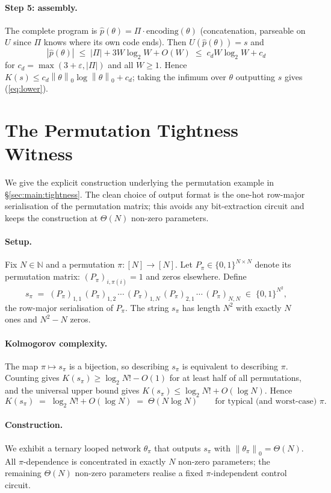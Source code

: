 \documentclass{article}
\theoremstyle{definition}
\newcommand{\N}{\mathbb{N}}
\newcommand{\B}{\{0,1\}}
\newcommand{\norm}[1]{\left\lVert#1\right\rVert}
\newcommand{\eps}{\varepsilon}
\begin{document}
\paragraph{Step 5: assembly.} The complete program is $\hat p(\theta) = \Pi \cdot \text{encoding}(\theta)$
(concatenation, parseable on $U$ since $\Pi$ knows where its own code ends).
Then $U(\hat p(\theta)) = s$ and
\[
  |\hat p(\theta)| \;\le\; |\Pi| + 3 W \log_2 W + O(W) \;\le\; c_d W \log_2 W + c_d
\]
for $c_d = \max(3 + \eps, |\Pi|)$ and all $W \ge 1$. Hence $K(s) \le c_d
  \norm{\theta}_0 \log \norm{\theta}_0 + c_d$; taking the infimum over $\theta$
outputting $s$ gives (\ref{eq:lower}).

\section{The Permutation Tightness Witness}\label{app:permutation}

We give the explicit construction underlying the permutation example in
\S\ref{sec:main:tightness}. The clean choice of output format is the one-hot
row-major serialisation of the permutation matrix; this avoids any
bit-extraction circuit and keeps the construction at $\Theta(N)$ non-zero
parameters.

\paragraph{Setup.} Fix $N \in \N$ and a permutation $\pi : [N] \to [N]$. Let $P_\pi \in \{0,1\}^{N
  \times N}$ denote its permutation matrix: $(P_\pi)_{i,\pi(i)} = 1$ and zeros
elsewhere. Define
\[
  s_\pi \;=\; (P_\pi)_{1,1}\,(P_\pi)_{1,2}\,\cdots\,(P_\pi)_{1,N}\,(P_\pi)_{2,1}\,\cdots\,(P_\pi)_{N,N} \;\in\; \B^{N^2},
\]
the row-major serialisation of $P_\pi$. The string $s_\pi$ has length $N^2$
with exactly $N$ ones and $N^2 - N$ zeros.

\paragraph{Kolmogorov complexity.} The map $\pi \mapsto s_\pi$ is a bijection, so describing $s_\pi$ is equivalent
to describing $\pi$. Counting gives $K(s_\pi) \ge \log_2 N! - O(1)$ for at
least half of all permutations, and the universal upper bound gives $K(s_\pi)
  \le \log_2 N! + O(\log N)$. Hence
\[
  K(s_\pi) \;=\; \log_2 N! + O(\log N) \;=\; \Theta(N \log N) \qquad \text{for typical (and worst-case) }\pi.
\]

\paragraph{Construction.} We exhibit a ternary looped network $\theta_\pi$ that outputs $s_\pi$ with
$\norm{\theta_\pi}_0 = \Theta(N)$. All $\pi$-dependence is concentrated in
exactly $N$ non-zero parameters; the remaining $\Theta(N)$ non-zero parameters
realise a fixed $\pi$-independent control circuit.
\end{document}
